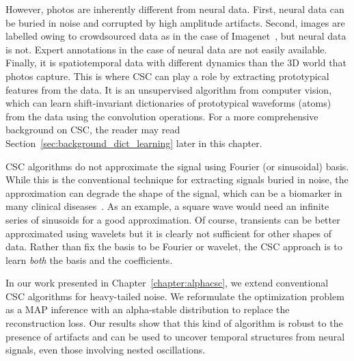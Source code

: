 However, photos are inherently different from neural data. First, neural data can be buried in noise and corrupted by high amplitude artifacts. Second, images are labelled owing to crowdsourced data as in the case of  Imagenet~\citep{deng2009imagenet}, but neural data is not. 
Expert annotations in the case of neural data are not easily available.
Finally, it is spatiotemporal data with different dynamics than the 3D world that photos capture. This is where \ac{CSC} can play a role by extracting prototypical features from the data. It is an unsupervised algorithm from computer vision, which can learn shift-invariant dictionaries of prototypical waveforms (atoms) from the data using the convolution operations. For a more comprehensive background on \ac{CSC}, the reader may read Section~\ref{sec:background_dict_learning} later in this chapter.

\ac{CSC} algorithms do not approximate the signal using Fourier (or sinusoidal) basis. While this is the conventional technique for extracting signals buried in noise, the approximation can degrade the shape of the signal, which can be a biomarker in many clinical diseases~\citep{cole2017brain}. As an example, a square wave would need an infinite series of sinusoids for a good approximation. Of course, transients can be better approximated using wavelets but it is clearly not sufficient for other shapes of data. Rather than fix the basis to be Fourier or wavelet, the \ac{CSC} approach is to learn \emph{both} the basis and the coefficients.

In our work presented in Chapter~\ref{chapter:alphacsc}, we extend conventional \ac{CSC} algorithms for heavy-tailed noise. We reformulate the optimization problem as a \ac{MAP} inference with an alpha-stable distribution to replace the reconstruction loss. Our results show that this kind of algorithm is robust to the presence of artifacts and can be used to uncover temporal structures from neural signals, even those involving nested oscillations.
